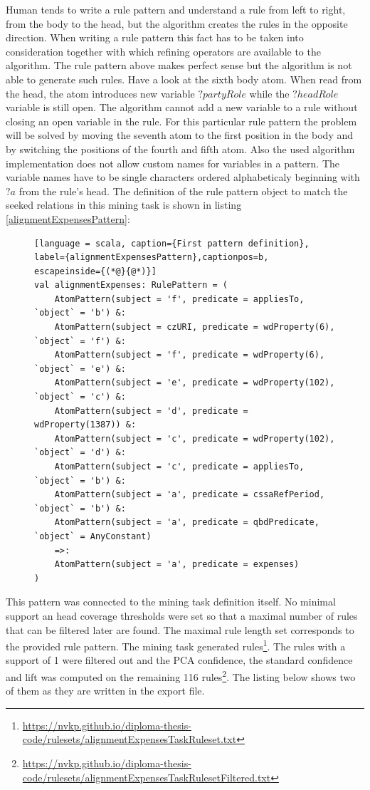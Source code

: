 Human tends to write a rule pattern and understand a rule from left to right, from the body to the head, but the algorithm creates the rules in the opposite direction. When writing a rule pattern this fact has to be taken into consideration together with which refining operators are available to the algorithm. The rule pattern above makes perfect sense but the algorithm is not able to generate such rules. Have a look at the sixth body atom. When read from the head, the atom introduces new variable $?partyRole$ while the $?headRole$ variable is still open. The algorithm cannot add a new variable to a rule without closing an open variable in the rule. For this particular rule pattern the problem will be solved by moving the seventh atom to the first position in the body and by switching the positions of the fourth and fifth atom. Also the used algorithm implementation does not allow custom names for variables in a pattern. The variable names have to be single characters ordered alphabeticaly beginning with $?a$ from the rule's head. The definition of the rule pattern object to match the seeked relations in this mining task is shown in listing \ref{alignmentExpensesPattern}:

\begin{figure}[h]
\begin{lstlisting}[language = scala, caption={First pattern definition}, label={alignmentExpensesPattern},captionpos=b, escapeinside={(*@}{@*)}]
val alignmentExpenses: RulePattern = (
    AtomPattern(subject = 'f', predicate = appliesTo, `object` = 'b') &:
    AtomPattern(subject = czURI, predicate = wdProperty(6), `object` = 'f') &:
    AtomPattern(subject = 'f', predicate = wdProperty(6), `object` = 'e') &:
    AtomPattern(subject = 'e', predicate = wdProperty(102), `object` = 'c') &:  
    AtomPattern(subject = 'd', predicate = wdProperty(1387)) &:
    AtomPattern(subject = 'c', predicate = wdProperty(102), `object` = 'd') &:
    AtomPattern(subject = 'c', predicate = appliesTo, `object` = 'b') &:
    AtomPattern(subject = 'a', predicate = cssaRefPeriod, `object` = 'b') &:
    AtomPattern(subject = 'a', predicate = qbdPredicate, `object` = AnyConstant)
    =>:
    AtomPattern(subject = 'a', predicate = expenses)
)
\end{lstlisting}
\end{figure}

This pattern was connected to the mining task definition itself. No minimal support an head coverage thresholds were set so that a maximal number of rules that can be filtered later are found. The maximal rule length set corresponds to the provided rule pattern. The mining task generated  rules\footnote{\href{https://nvkp.github.io/diploma-thesis-code/rulesets/alignmentExpensesTaskRuleset.txt}{https://nvkp.github.io/diploma-thesis-code/rulesets/alignmentExpensesTaskRuleset.txt}}. The rules with a support of 1 were filtered out and the PCA confidence, the standard confidence and lift was computed on the remaining 116 rules\footnote{\href{https://nvkp.github.io/diploma-thesis-code/rulesets/alignmentExpensesTaskRulesetFiltered.txt}{https://nvkp.github.io/diploma-thesis-code/rulesets/alignmentExpensesTaskRulesetFiltered.txt}}. The listing below shows two of them as they are written in the export file.

